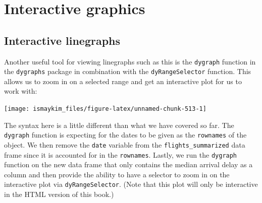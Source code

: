 \documentclass[12pt,]{krantz}
\makeatletter
\newenvironment{Shaded}{\begin{snugshade}}{\end{snugshade}}
\newcommand{\KeywordTok}[1]{\textcolor[rgb]{0.27,0.27,0.27}{\textbf{#1}}}
\newcommand{\DataTypeTok}[1]{\textcolor[rgb]{0.27,0.27,0.27}{#1}}
\newcommand{\StringTok}[1]{\textcolor[rgb]{0.5,0.5,0.5}{#1}}
\newcommand{\OtherTok}[1]{\textcolor[rgb]{0.37,0.37,0.37}{#1}}
\newcommand{\OperatorTok}[1]{\textcolor[rgb]{0.43,0.43,0.43}{\textbf{#1}}}
\newcommand{\NormalTok}[1]{#1}
\newenvironment{kframe}{%
\medskip{}
\setlength{\fboxsep}{.8em}
 \def\at@end@of@kframe{}%
 \ifinner\ifhmode%
  \def\at@end@of@kframe{\end{minipage}}%
  \begin{minipage}{\columnwidth}%
 \fi\fi%
 \def\FrameCommand##1{\hskip\@totalleftmargin \hskip-\fboxsep
 \colorbox{shadecolor}{##1}\hskip-\fboxsep
     \hskip-\linewidth \hskip-\@totalleftmargin \hskip\columnwidth}%
 \MakeFramed {\advance\hsize-\width
   \@totalleftmargin\z@ \linewidth\hsize
   \@setminipage}}%
 {\par\unskip\endMakeFramed%
 \at@end@of@kframe}
\renewenvironment{Shaded}{\begin{kframe}}{\end{kframe}}
\theoremstyle{definition}
\theoremstyle{definition}
\theoremstyle{definition}
\theoremstyle{remark}
\makeatother
\begin{document}
\section{Interactive graphics}\label{interactive-graphics}

\subsection{Interactive linegraphs}\label{interactive-linegraphs}

Another useful tool for viewing linegraphs such as this is the
\texttt{dygraph} function in the \texttt{dygraphs} package in
combination with the \texttt{dyRangeSelector} function. This allows us
to zoom in on a selected range and get an interactive plot for us to
work with:

\begin{Shaded}
\end{Shaded}

\begin{center}\texttt{[image: ismaykim\_files/figure-latex/unnamed-chunk-513-1]} \end{center}

The syntax here is a little different than what we have covered so far.
The \texttt{dygraph} function is expecting for the dates to be given as
the \texttt{rownames} of the object. We then remove the \texttt{date}
variable from the \texttt{flights\_summarized} data frame since it is
accounted for in the \texttt{rownames}. Lastly, we run the
\texttt{dygraph} function on the new data frame that only contains the
median arrival delay as a column and then provide the ability to have a
selector to zoom in on the interactive plot via
\texttt{dyRangeSelector}. (Note that this plot will only be interactive
in the HTML version of this book.)



\backmatter
\printindex
\end{document}
